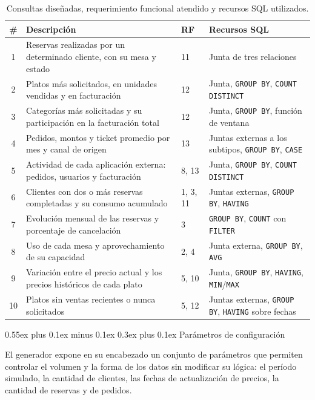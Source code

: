 \documentclass[conference,a4paper,10pt]{IEEEtran}
\makeatletter
\def\subsection{\@startsection{subsection}{2}{\z@}
{0.55ex plus 0.1ex minus 0.1ex}
{0.3ex plus 0.1ex}
{\normalfont\small\bfseries}}
\makeatother
\begin{document}
\begin{table}[t]
\centering
\caption{Consultas diseñadas, requerimiento funcional atendido y recursos SQL utilizados.}
\label{tab:consultas}
\footnotesize
\setlength{\tabcolsep}{4pt}
\begin{tabular}{clll}
\toprule
\# & Descripción & RF & Recursos SQL \\
\midrule
1 & Reservas realizadas por un determinado cliente, con su mesa y estado & 11 & Junta de tres relaciones \\
2 & Platos más solicitados, en unidades vendidas y en facturación & 12 & Junta, \texttt{GROUP BY}, \texttt{COUNT DISTINCT} \\
3 & Categorías más solicitadas y su participación en la facturación total & 12 & Junta, \texttt{GROUP BY}, función de ventana \\
4 & Pedidos, montos y ticket promedio por mes y canal de origen & 13 & Juntas externas a los subtipos, \texttt{GROUP BY}, \texttt{CASE} \\
5 & Actividad de cada aplicación externa: pedidos, usuarios y facturación & 8, 13 & Junta, \texttt{GROUP BY}, \texttt{COUNT DISTINCT} \\
6 & Clientes con dos o más reservas completadas y su consumo acumulado & 1, 3, 11 & Juntas externas, \texttt{GROUP BY}, \texttt{HAVING} \\
7 & Evolución mensual de las reservas y porcentaje de cancelación & 3 & \texttt{GROUP BY}, \texttt{COUNT} con \texttt{FILTER} \\
8 & Uso de cada mesa y aprovechamiento de su capacidad & 2, 4 & Junta externa, \texttt{GROUP BY}, \texttt{AVG} \\
9 & Variación entre el precio actual y los precios históricos de cada plato & 5, 10 & Junta, \texttt{GROUP BY}, \texttt{HAVING}, \texttt{MIN}/\texttt{MAX} \\
10 & Platos sin ventas recientes o nunca solicitados & 5, 12 & Juntas externas, \texttt{GROUP BY}, \texttt{HAVING} sobre fechas \\
\bottomrule
\end{tabular}
\end{table}

\subsection{Parámetros de configuración}

El generador expone en su encabezado un conjunto de parámetros que permiten controlar el volumen y la forma de los datos sin modificar su lógica: el período simulado, la cantidad de clientes, las fechas de actualización de precios, la cantidad de reservas y de pedidos. 
\end{document}
